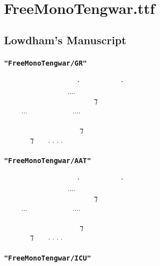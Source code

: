\documentclass{article}
\begin{document}
\tableofcontents

\newpage

\section{FreeMonoTengwar.ttf}

\subsection{Lowdham’s Manuscript}

\subsubsection*{\texttt{"FreeMonoTengwar/GR"}}

\freeGR
  ‍   ⸱‍  ‍ ⸱ \\
    ‍....  ‍  \\
  ‍   ‍ ‍ ⁊ ‍  \\
...  ....   \\
         ‍ \\
 ‍ ‍‍   ⁊  ‍ ‍ \\
 ‍ ⁊  . . . . \normalfont

\subsubsection*{\texttt{"FreeMonoTengwar/AAT"}}

\freeAAT
  ‍   ⸱‍  ‍ ⸱ \\
    ‍....  ‍  \\
  ‍   ‍ ‍ ⁊ ‍  \\
...  ....   \\
         ‍ \\
 ‍ ‍‍   ⁊  ‍ ‍ \\
 ‍ ⁊  . . . . \normalfont

\subsubsection*{\texttt{"FreeMonoTengwar/ICU"}}
\end{document}
